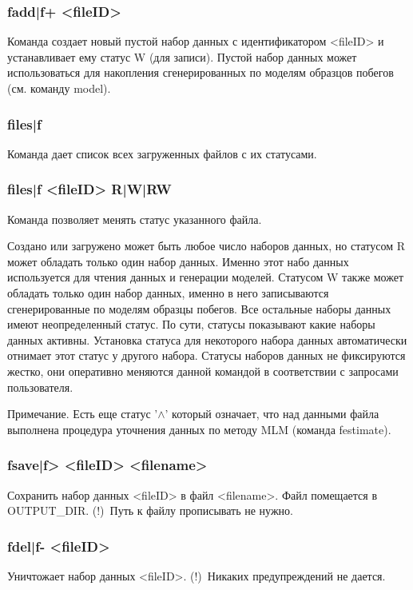 \documentclass[a4paper]{article}
\begin{document}
\subsubsection{fadd|f+ <fileID>}
Команда создает новый пустой набор данных с идентификатором <fileID> и устанавливает ему статус W (для записи). Пустой набор данных может использоваться для накопления сгенерированных по моделям образцов побегов (см. команду model).

\subsubsection{files|f} 
Команда дает список всех загруженных файлов с их статусами.

\subsubsection{files|f <fileID> R|W|RW} 
Команда позволяет менять статус указанного файла. 

Создано или загружено может быть любое число наборов данных, но статусом R может обладать только один набор данных. Именно этот набо данных используется для чтения данных и генерации моделей. Статусом W также может обладать только один набор данных, именно в него записываются сгенерированные по моделям образцы побегов. Все остальные наборы данных имеют неопределенный статус. По сути, статусы показывают какие наборы данных активны. Установка статуса для некоторого набора данных автоматически отнимает этот статус у другого набора. Статусы наборов данных не фиксируются жестко, они оперативно меняются данной командой в соответствии с запросами пользователя.

Примечание. Есть еще статус '$\wedge$' который означает, что над данными файла выполнена процедура уточнения данных по методу MLM (команда festimate).

\subsubsection{fsave|f> <fileID> <filename>}
Сохранить набор данных <fileID> в файл <filename>. Файл помещается в OUTPUT\_DIR. (!)~Путь к файлу прописывать не нужно.

\subsubsection{fdel|f- <fileID>}
Уничтожает набор данных <fileID>. (!)~Никаких предупреждений не дается.
\end{document}
